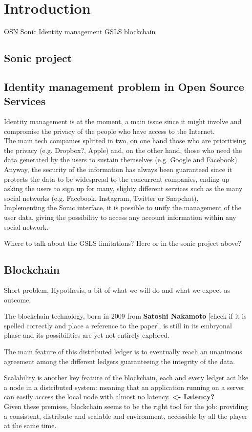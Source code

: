 \section{Introduction}
\label{S:1}

OSN 
Sonic 
Identity management 
GSLS 
blockchain 

\subsection{Sonic project}

\subsection{Identity management problem in Open Source Services}

Identity management is at the moment, a main issue since it might involve and compromise the privacy of the people who have access to the Internet. 
\\
The main tech companies splitted in two, on one hand those who are prioritising the privacy (e.g. Dropbox?, Apple) and, on the other hand, those who need the data generated by the users to sustain themselves (e.g. Google and Facebook).
\\
Anyway, the security of the information has always been guaranteed since it protects the data to be widespread to the concurrent companies, ending up asking the users to sign up for many, slighty different services such as the many social networks (e.g. Facebook, Instagram, Twitter or Snapchat).
\\
Implementing the Sonic interface, it is possible to unify the management of the user data, giving the possibility to access any account information within any social network.

\begin{answer}
  Where to talk about the GSLS limitations? Here or in the sonic project above?
\end{answer}


\subsection{Blockchain}

Short problem, 
Hypothesis,
a bit of what we will do and what we expect as outcome,

The blockchain technology, born in 2009 from \textbf{Satoshi Nakamoto} [check if it is spelled correctly and place a reference to the paper], is still in its embryonal phase and its possibilities are yet not entirely explored.

The main feature of this distributed ledger is to eventually reach an unanimous agreement among the different ledgers guaranteeing the integrity of the data. 

Scalability is another key feature of the blockchain, each and every ledger act like a node in a distributed system: meaning that an application running on a server can easily access the local node with almost no latency. \textbf{<- Latency? }
\\
Given these premises, blockchain seems to be the right tool for the job: providing a consistent, distribute and scalable and environment, accessible by all the player at the same time.